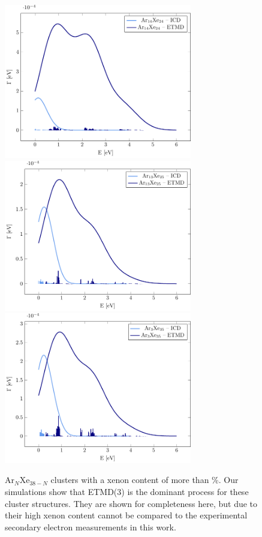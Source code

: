 \begin{figure}
 \centering
 \includegraphics[width=8.2cm]{pics/Ar14Xe24.pdf}
 \includegraphics[width=8.2cm]{pics/Ar13Xe25.pdf}
 \includegraphics[width=8.2cm]{pics/Ar3Xe35.pdf}
 \caption{Ar$_N$Xe$_{38-N}$ clusters with a xenon content of more
          than \unit[50]{\%}.
          Our simulations show that ETMD(3) is the dominant process
          for these cluster structures.
          They are shown for completeness here, but due to their high xenon
          content cannot be compared to the experimental 
          secondary electron measurements in this work.}
 \label{figure:ArXe_gt50}
\end{figure}



